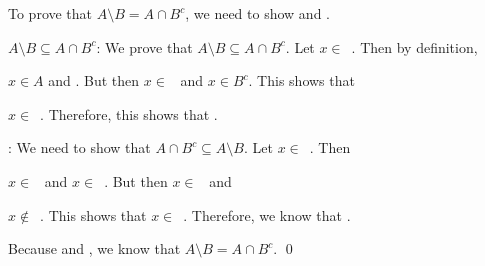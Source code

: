 \documentclass[11pt,letterpaper]{article}
\begin{document}
To prove that $A \setminus B= A \cap B^c$, we need to show \underline{\hspace{3cm}} and \underline{\hspace{3cm}}. \par\vspace{3\baselineskip}

$A \setminus B \subseteq A \cap B^c$: We prove that $A \setminus B \subseteq A \cap B^c$. Let $x \in$~\underline{\hspace{3cm}}. Then by definition, \pspace

$x \in A$ and \underline{\hspace{3cm}}. But then $x \in$~\underline{\hspace{3cm}} and $x \in B^c$. This shows that \pspace

$x \in$~\underline{\hspace{3cm}}. Therefore, this shows that \underline{\hspace{3cm}}. \par\vspace{3\baselineskip}

\underline{\hspace{3cm}}: We need to show that $A \cap B^c \subseteq A \setminus B$. Let $x \in$~\underline{\hspace{3cm}}. Then \pspace

$x \in$~\underline{\hspace{3cm}} and $x \in$~\underline{\hspace{3cm}}. But then $x \in$~\underline{\hspace{3cm}} and \pspace

$x \notin$~\underline{\hspace{3cm}}. This shows that $x \in$~\underline{\hspace{3cm}}. Therefore, we know that \underline{\hspace{3cm}}. \par\vspace{3\baselineskip}

Because \underline{\hspace{3cm}} and \underline{\hspace{3cm}}, we know that $A \setminus B= A \cap B^c$. \qed
\end{document}

